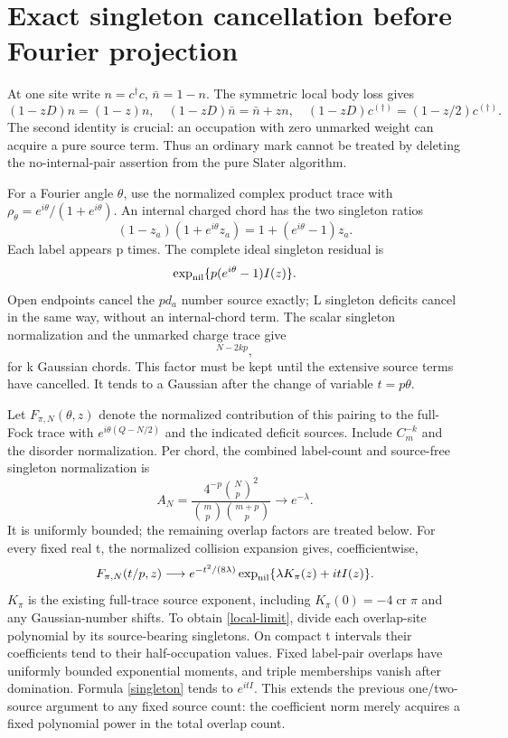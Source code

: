 \documentclass[11pt]{article}
\begin{document}
\newpage
\section{Exact singleton cancellation before Fourier projection}
At one site write $n=c^\dagger c$, $\bar n=1-n$. The symmetric local
body loss gives
\[
 (1-zD)n=(1-z)n,\quad
 (1-zD)\bar n=\bar n+zn,\quad
 (1-zD)c^{(\dagger)}=(1-z/2)c^{(\dagger)}.
\]
The second identity is crucial: an occupation with zero unmarked
weight can acquire a pure source term. Thus an ordinary mark cannot
be treated by deleting the no-internal-pair assertion from the pure
Slater algorithm.

For a Fourier angle $\theta$, use the normalized complex product trace
with $\rho_\theta=e^{i\theta}/(1+e^{i\theta})$. An internal charged
chord has the two singleton ratios
\[
 (1-z_a)(1+e^{i\theta}z_a)=1+(e^{i\theta}-1)z_a.
\]
Each label appears p times. The complete ideal singleton residual is
\begin{equation}
 \exp_{\rm nil}\{p(e^{i\theta}-1)I(z)\}.\label{singleton}
\end{equation}
Open endpoints cancel the $pd_a$ number source exactly; L singleton
deficits cancel in the same way, without an internal-chord term.
The scalar singleton normalization and the unmarked charge trace give
\begin{equation}
 [\cos(\theta/2)]^{N-2kp},\label{cosine}
\end{equation}
for k Gaussian chords. This factor must be kept until the extensive
source terms have cancelled. It tends to a Gaussian after the change
of variable $t=p\theta$.

Let $F_{\pi,N}(\theta,z)$ denote the normalized contribution of this
pairing to the full-Fock trace with
$e^{i\theta(Q-N/2)}$ and the indicated deficit sources. Include
$C_m^{-k}$ and the disorder normalization. Per chord, the combined
label-count and source-free singleton normalization is
\[
 A_N=\frac{4^{-p}\binom Np^2}{\binom mp\binom{m+p}p}
 \longrightarrow e^{-\lambda}.
\]
It is uniformly bounded; the remaining overlap factors are treated
below. For every fixed real t,
the normalized collision expansion gives, coefficientwise,
\begin{equation}
 F_{\pi,N}(t/p,z)\longrightarrow
 e^{-t^2/(8\lambda)}
 \exp_{\rm nil}\{\lambda K_\pi(z)+it I(z)\}.\label{local-limit}
\end{equation}
$K_\pi$ is the existing full-trace source exponent, including
$K_\pi(0)=-4\operatorname{cr}\pi$ and any Gaussian-number shifts.
To obtain \eqref{local-limit}, divide each overlap-site polynomial by
its source-bearing singletons. On compact t intervals their
coefficients tend to their half-occupation values. Fixed label-pair
overlaps have uniformly bounded exponential moments, and triple
memberships vanish after domination. Formula \eqref{singleton} tends
to $e^{itI}$. This extends the previous one/two-source argument to any
fixed source count: the coefficient norm merely acquires a fixed
polynomial power in the total overlap count.
\end{document}
